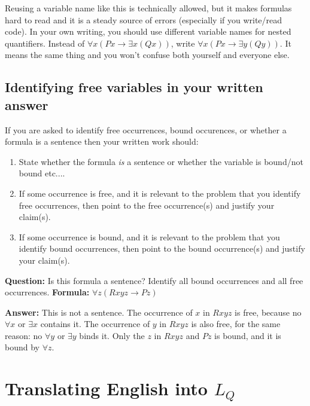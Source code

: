 \documentclass[11pt]{article}
\begin{document}
\begin{notebox}
Reusing a variable name like this is technically allowed, but it makes formulas hard to read and it is a steady source of errors (especially if you write/read code). In your own writing, you should use different variable names for nested quantifiers. Instead of $\forall x(Px \to \exists x(Qx))$, write $\forall x(Px \to \exists y(Qy))$. It means the same thing and you won't confuse both yourself and everyone else.
\end{notebox}

\subsection{Identifying free variables in your written answer}

If you are asked to identify free occurrences, bound occurences, or whether a formula is a sentence then your written work should:

\begin{enumerate}
    \item State whether the formula \emph{is} a sentence or whether the variable is bound/not bound etc....
    \item If some occurrence is free, and it is relevant to the problem that you identify free occurrences, then point to the free occurrence(s) and justify your claim(s).
    \item If some occurrence is bound, and it is relevant to the problem that you identify bound occurrences, then point to the bound occurrence(s) and justify your claim(s).
\end{enumerate}

\begin{example}
\textbf{Question:} Is this formula a sentence? Identify all bound occurrences and all free occurrences.
\textbf{Formula:} $\forall z(Rxyz \to Pz)$

\textbf{Answer:} This is not a sentence. The occurrence of $x$ in $Rxyz$ is free, because no $\forall x$ or $\exists x$ contains it. The occurrence of $y$ in $Rxyz$ is also free, for the same reason: no $\forall y$ or $\exists y$ binds it. Only the $z$ in $Rxyz$ and $Pz$ is bound, and it is bound by $\forall z$.
\end{example}

\section{Translating English into $L_Q$}
\end{document}
